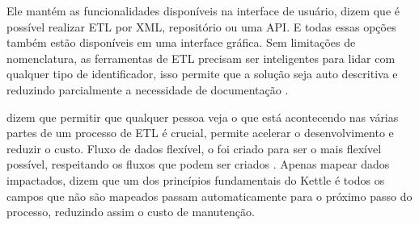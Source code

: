 Ele mantém as funcionalidades disponíveis na interface de usuário,  dizem que é possível realizar ETL por XML, repositório ou uma API. E todas essas opções também estão disponíveis em uma interface gráfica. Sem limitações de nomenclatura, as ferramentas de ETL precisam ser inteligentes para lidar com qualquer tipo de identificador, isso permite que a solução seja auto descritiva e reduzindo parcialmente a necessidade de documentação \citep{kettle}.

 dizem que permitir que qualquer pessoa veja o que está acontecendo nas várias partes de um processo de ETL é crucial, permite acelerar o desenvolvimento e reduzir o custo. Fluxo de dados flexível, o \pdi foi criado para ser o mais flexível possível, respeitando os fluxos que podem ser criados \citep{kettle}. Apenas mapear dados impactados,  dizem que um dos princípios fundamentais do Kettle é todos os campos que não são mapeados passam automaticamente para o próximo passo do processo, reduzindo assim o custo de manutenção.

